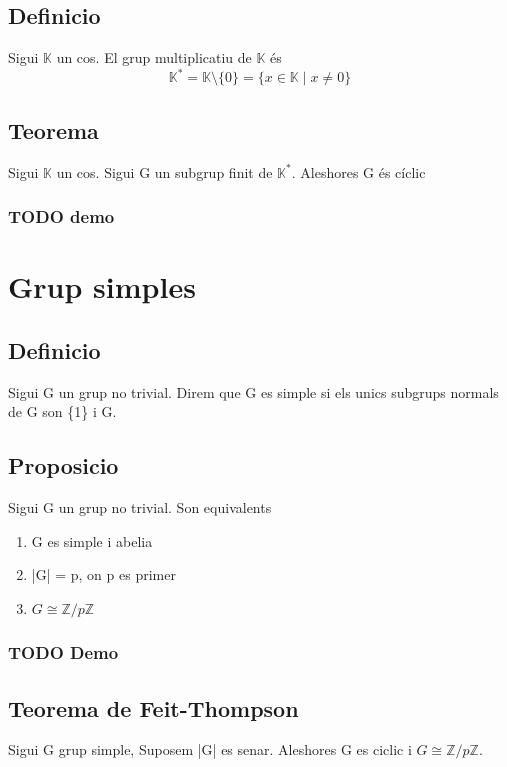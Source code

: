 \documentclass[11pt]{article}
\begin{document}
\subsection{Definicio}
\label{sec:org906f6eb}
Sigui \(\mathbb{K}\) un cos. El grup multiplicatiu de \(\mathbb{K}\) és \\
\begin{equation*}
\mathbb{K}^* = \mathbb{K} \setminus \{0\} = \{x \in \mathbb{K} \mid x \neq 0\}
\end{equation*}

\subsection{Teorema}
\label{sec:orgb21f7fd}
Sigui \(\mathbb{K}\) un cos. Sigui G un subgrup finit de \(\mathbb{K}^*\). Aleshores G és cíclic

\subsubsection{{\bfseries\sffamily TODO} demo}
\label{sec:org225d814}

\section{Grup simples}
\label{sec:org84ea34e}
\subsection{Definicio}
\label{sec:org7527873}
Sigui G un grup no trivial. Direm que G es simple si els unics subgrups normals de G son \{1\} i G.
\subsection{Proposicio}
\label{sec:org46ba54a}
Sigui G un grup no trivial. Son equivalents
\begin{enumerate}
\item G es simple i abelia
\item |G| = p, on p es primer
\item \(G \cong \mathbb{Z}/p\mathbb{Z}\)
\end{enumerate}

\subsubsection{{\bfseries\sffamily TODO} Demo}
\label{sec:org7b9adb5}
\subsection{Teorema de Feit-Thompson}
\label{sec:orgfc0cf06}
Sigui G grup simple, Suposem |G| es senar. Aleshores G es ciclic i \(G \cong \mathbb{Z}/p\mathbb{Z}\).
\end{document}
